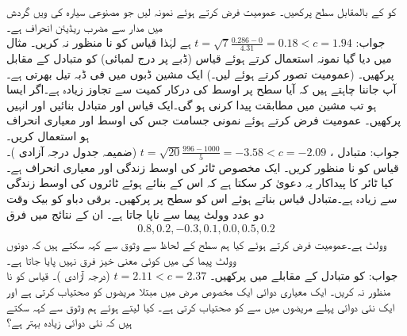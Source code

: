 \quad
{} کو  کے بالمقابل سطح  پرکھیں۔ عمومیت فرض کرتے ہوئے نمونہ  لیں جو مصنوعی سیارہ  کی  ویں گردش میں مدار سے مضرب  ریڈیئن انحراف ہے۔\\
جواب:\quad
$t=\sqrt{7}\tfrac{0.286-0}{4.31}=0.18<c=1.94$
ہے لہٰذا قیاس کو نا منظور نہ کریں۔
\quad
مثال  میں دیا گیا نمونہ استعمال کرتے ہوئے قیاس  (ڈبے پر درج لمبائی) کو متبادل  کے مقابل پرکھیں۔ (عمومیت تصور کرتے ہوئے  لیں۔)
\quad
ایک مشین ڈبوں میں فی ڈبہ  تیل بھرتی ہے۔آپ جاننا چاہتے ہیں کہ آیا  سطح پر اوسط کی درکار کمیت  سے  تجاوز زیادہ ہے۔اگر ایسا ہو تب مشین میں مطابقت پیدا کرنی ہو گی۔ایک قیاس اور متبادل  بنائیں اور انہیں پرکھیں۔ عمومیت فرض کرتے ہوئے نمونی جسامت  جس کی  اوسط  اور معیاری انحراف   ہو استعمال کریں۔\\
جواب:\quad
متبادل ،
$t=\sqrt{20}\tfrac{996-1000}{5}=-3.58<c=-2.09$
(ضمیمہ  جدول   درجہ آزادی )۔ قیاس  کو نا منظور کریں۔
\quad
ایک مخصوص ٹائر کی اوسط زندگی  اور معیاری انحراف  ہے۔کیا ٹائر کا پیداکار یہ دعویٰ کر سکتا ہے کہ اس کے بنائے ہوئے ٹائروں کی اوسط زندگی  سے زیادہ ہے۔متبادل قیاس بناتے ہوئے اس کو  سطح پر پرکھیں۔
\quad
برقی دباو کو بیک وقت دو عدد وولٹ پیما سے ناپا جاتا ہے۔ ان کے نتائج میں فرق 
\begin{align*}
0.8,0.2,-0.3,0.1,0.0,0.5,0.2
\end{align*}
 وولٹ  ہے۔عمومیت فرض کرتے ہوئے کیا ہم  سطح کے لحاظ سے وثوق سے کہہ سکتے ہیں کہ دونوں وولٹ پیما کی  میں کوئی معنی خیز فرق نہیں پایا جاتا ہے۔\\
جواب:\quad
{} کو متبادل  کے مقابلے میں پرکھیں۔
$t=2.11<c=2.37$
(درجہ آزادی )۔ قیاس کو نا منظور نہ کریں۔
\quad
ایک معیاری دوائی ایک مخصوص مرض  میں مبتلا  مریضوں کو صحتیاب کرتی ہے اور ایک نئی دوائی پہلے  مریضوں میں سے  کو صحتیاب کرتی ہے۔  کیا  لیتے ہوئے ہم وثوق سے کہہ سکتے ہیں کہ نئی دوائی زیادہ بہتر ہے؟
